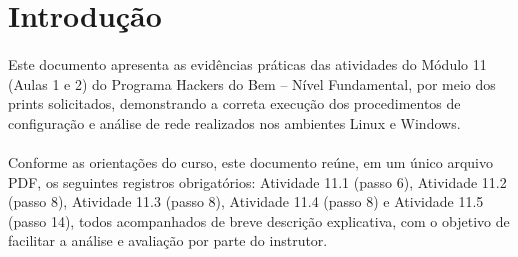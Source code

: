 \section{Introdução}

\paragraph{}
Este documento apresenta as evidências práticas das atividades do Módulo 11
(Aulas 1 e 2) do Programa Hackers do Bem -- Nível Fundamental, por meio dos
prints solicitados, demonstrando a correta execução dos procedimentos de
configuração e análise de rede realizados nos ambientes Linux e Windows.

\paragraph{}
Conforme as orientações do curso, este documento reúne, em um único arquivo
PDF, os seguintes registros obrigatórios: Atividade 11.1 (passo 6), Atividade
11.2 (passo 8), Atividade 11.3 (passo 8), Atividade 11.4 (passo 8) e Atividade
11.5 (passo 14), todos acompanhados de breve descrição explicativa, com o
objetivo de facilitar a análise e avaliação por parte do instrutor.
